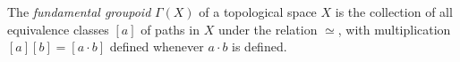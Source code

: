 The \textit{fundamental groupoid} $\Gamma(X)$ of a topological space $X$ is the collection of all equivalence classes $[a]$ of paths in $X$ under the relation $\simeq$, with multiplication $[a][b] = [a \cdot b]$ defined whenever $a \cdot b$ is defined.
